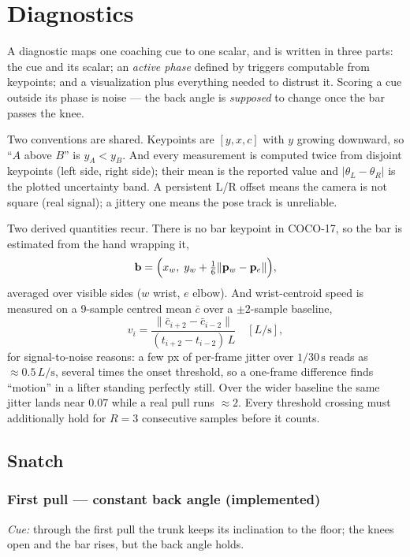 \documentclass[10pt,a4paper]{article}
\newcommand{\Lt}{L}                      %
\newcommand{\conf}{c}
\begin{document}
\section{Diagnostics}

A diagnostic maps one coaching cue to one scalar, and is written in three parts:
the cue and its scalar; an \emph{active phase} defined by triggers computable
from keypoints; and a visualization plus everything needed to distrust it.
Scoring a cue outside its phase is noise --- the back angle is \emph{supposed}
to change once the bar passes the knee.

Two conventions are shared. Keypoints are $[y,x,\conf]$ with $y$ growing
downward, so ``$A$ above $B$'' is $y_A<y_B$. And every measurement is computed
twice from disjoint keypoints (left side, right side); their mean is the reported
value and $|\theta_L-\theta_R|$ is the plotted uncertainty band. A persistent
L/R offset means the camera is not square (real signal); a jittery one means the
pose track is unreliable.

Two derived quantities recur. There is no bar keypoint in COCO-17, so the bar is
estimated from the hand wrapping it,
\[
  \mathbf{b}=\Bigl(x_w,\; y_w+\tfrac{1}{6}\lVert \mathbf{p}_w-\mathbf{p}_e\rVert\Bigr),
\]
averaged over visible sides ($w$ wrist, $e$ elbow). And wrist-centroid speed is
measured on a 9-sample centred mean $\bar{c}$ over a $\pm2$-sample baseline,
\[
  v_i=\frac{\lVert \bar{c}_{i+2}-\bar{c}_{i-2}\rVert}{(t_{i+2}-t_{i-2})\,\Lt}
  \quad[\Lt/\mathrm{s}],
\]
for signal-to-noise reasons: a few px of per-frame jitter over $1/30\,\mathrm{s}$
reads as $\approx0.5\,\Lt/\mathrm{s}$, several times the onset threshold, so a
one-frame difference finds ``motion'' in a lifter standing perfectly still. Over
the wider baseline the same jitter lands near $0.07$ while a real pull runs
$\approx2$. Every threshold crossing must additionally hold for $R=3$ consecutive
samples before it counts.

\subsection{Snatch}

\subsubsection{First pull --- constant back angle (implemented)}

\emph{Cue:} through the first pull the trunk keeps its inclination to the floor;
the knees open and the bar rises, but the back angle holds.
\end{document}
